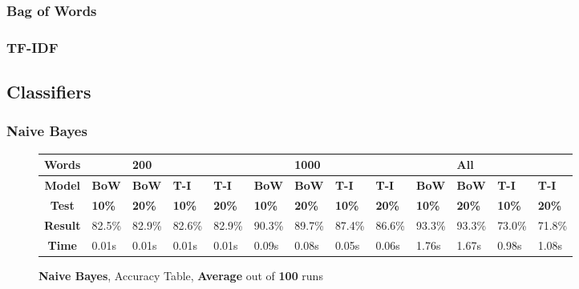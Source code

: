 \documentclass{article}
\begin{document}
	\subsubsection{Bag of Words}
	\subsubsection{TF-IDF}
	
	
	\subsection{Classifiers}
	\subsubsection{Naive Bayes}
	\begin{figure}[!h]
		\begin{tabular}{||c||l|l|l|l||l|l|l|l||l|l|l|l||}
			\hline
			\textbf{Words} &  & \textbf{200} & & & &\textbf{1000} & & & & \textbf{All} &  & \\ \hline 
			\textbf{Model} & \textbf{BoW} & \textbf{BoW} & \textbf{T-I} & \textbf{T-I} &\textbf{BoW} & \textbf{BoW} & \textbf{T-I} & \textbf{T-I} & \textbf{BoW} & \textbf{BoW} & \textbf{T-I} & \textbf{T-I}\\ \hline
			\textbf{Test} & \textbf{10\%} & \textbf{20\%} & \textbf{10\%} & \textbf{20\%} & \textbf{10\%} & \textbf{20\%} & \textbf{10\%} & \textbf{20\%} & \textbf{10\%} & \textbf{20\%} & \textbf{10\%} & \textbf{20\%} \\ \hline \hline  
			\textbf{Result} & 82.5\% & 82.9\% & 82.6\% & 82.9\% & 90.3\% & 89.7\% & 87.4\% & 86.6\% & 93.3\% & 93.3\% & 73.0\% & 71.8\% \\ \hline 
			\textbf{Time} & 0.01s & 0.01s & 0.01s & 0.01s & 0.09s & 0.08s & 0.05s & 0.06s & 1.76s & 1.67s & 0.98s & 1.08s \\ \hline 
		\end{tabular}
		\caption{\textbf{Naive Bayes}, Accuracy Table, \textbf{Average} out of \textbf{100} runs}
	\end{figure}
    
\end{document}
